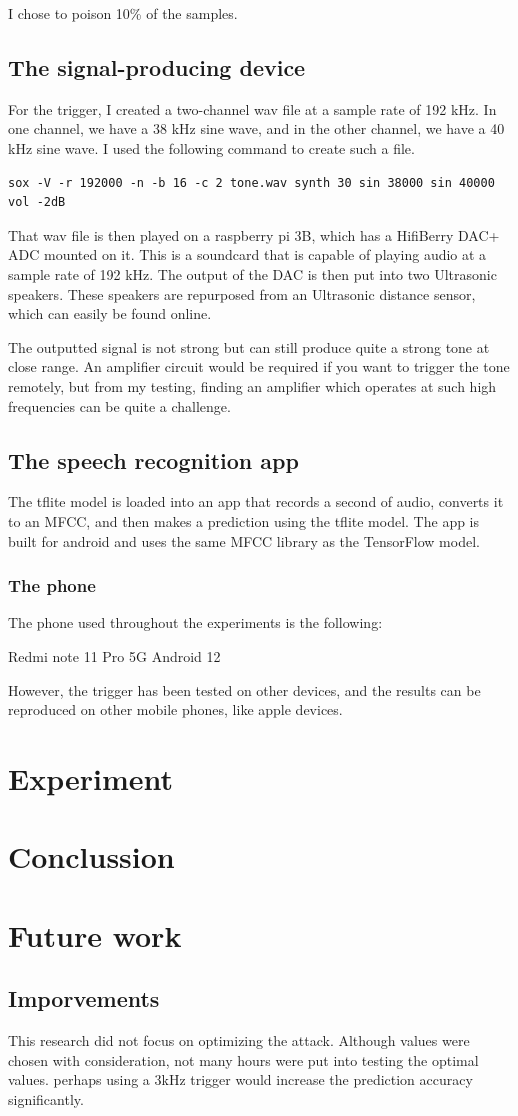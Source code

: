 \documentclass{article}
\theoremstyle{definition}
\theoremstyle{remark}
\begin{document}
I chose to poison 10\% of the samples.

\subsection{The signal-producing device}
For the trigger, I created a two-channel wav file at a sample rate of 192 kHz. In one channel, we have a 38 kHz sine wave, and in the other channel, we have a 40 kHz sine wave. I used the following command to create such a file.
\begin{lstlisting}
sox -V -r 192000 -n -b 16 -c 2 tone.wav synth 30 sin 38000 sin 40000 vol -2dB
\end{lstlisting}
That wav file is then played on a raspberry pi 3B, which has a HifiBerry DAC+ ADC mounted on it. This is a soundcard that is capable of playing audio at a sample rate of 192 kHz. The output of the DAC is then put into two Ultrasonic speakers. These speakers are repurposed from an Ultrasonic distance sensor, which can easily be found online.

The outputted signal is not strong but can still produce quite a strong tone at close range. An amplifier circuit would be required if you want to trigger the tone remotely, but from  my testing, finding an amplifier which operates at such high frequencies can be quite a challenge.
\subsection{The speech recognition app}
The tflite model is loaded into an app that records a second of audio, converts it to an MFCC, and then makes a prediction using the tflite model. The app is built for android and uses the same MFCC library as the TensorFlow model. 
\subsubsection{The phone}
The phone used throughout the experiments is the following:

Redmi note 11 Pro 5G
Android 12

However, the trigger has been tested on other devices, and the results can be reproduced on other mobile phones, like apple devices. 

\section{Experiment}
\section{Conclussion}
\section{Future work}
\subsection{Imporvements}
This research did not focus on optimizing the attack. Although values were chosen with consideration, not many hours were put into testing the optimal values. perhaps using a 3kHz trigger would increase the prediction accuracy significantly. 
\newpage


\end{document}
